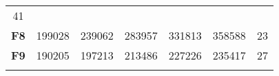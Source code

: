 \documentclass[12pt,a4paper]{article}
\begin{document}
\begin{longtable}[c]{@{}crrrrrr@{}}
\begin{minipage}[t]{0.07\columnwidth}\raggedleft\strut
41
\strut\end{minipage}\tabularnewline
\begin{minipage}[t]{0.11\columnwidth}\centering\strut
\textbf{F8}
\strut\end{minipage} &
\begin{minipage}[t]{0.08\columnwidth}\raggedleft\strut
199028
\strut\end{minipage} &
\begin{minipage}[t]{0.08\columnwidth}\raggedleft\strut
239062
\strut\end{minipage} &
\begin{minipage}[t]{0.09\columnwidth}\raggedleft\strut
283957
\strut\end{minipage} &
\begin{minipage}[t]{0.10\columnwidth}\raggedleft\strut
331813
\strut\end{minipage} &
\begin{minipage}[t]{0.11\columnwidth}\raggedleft\strut
358588
\strut\end{minipage} &
\begin{minipage}[t]{0.07\columnwidth}\raggedleft\strut
23
\strut\end{minipage}\tabularnewline
\begin{minipage}[t]{0.11\columnwidth}\centering\strut
\textbf{F9}
\strut\end{minipage} &
\begin{minipage}[t]{0.08\columnwidth}\raggedleft\strut
190205
\strut\end{minipage} &
\begin{minipage}[t]{0.08\columnwidth}\raggedleft\strut
197213
\strut\end{minipage} &
\begin{minipage}[t]{0.09\columnwidth}\raggedleft\strut
213486
\strut\end{minipage} &
\begin{minipage}[t]{0.10\columnwidth}\raggedleft\strut
227226
\strut\end{minipage} &
\begin{minipage}[t]{0.11\columnwidth}\raggedleft\strut
235417
\strut\end{minipage} &
\begin{minipage}[t]{0.07\columnwidth}\raggedleft\strut
27
\strut\end{minipage}\tabularnewline
\begin{minipage}[t]{0.11\columnwidth}\centering\strut

\end{minipage}
\end{longtable}
\end{document}
